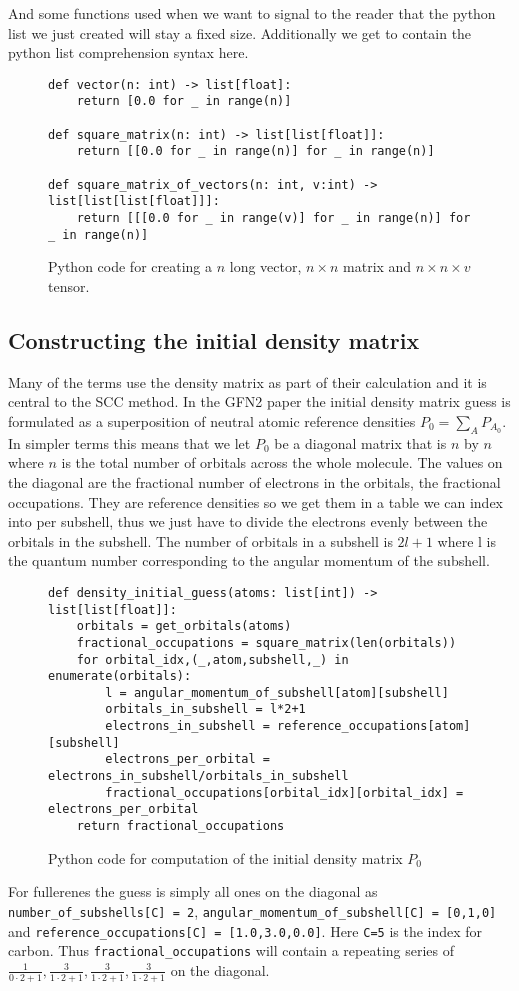 And some functions used when we want to signal to the reader that the python list we just created will stay a fixed size. Additionally we get to contain the python list comprehension syntax here. 

\begin{figure}[H]
\begin{verbatim}
def vector(n: int) -> list[float]:
    return [0.0 for _ in range(n)]

def square_matrix(n: int) -> list[list[float]]:
    return [[0.0 for _ in range(n)] for _ in range(n)]

def square_matrix_of_vectors(n: int, v:int) -> list[list[list[float]]]:
    return [[[0.0 for _ in range(v)] for _ in range(n)] for _ in range(n)]
\end{verbatim}
    \caption{Python code for creating a $n$ long vector, $n\times n$ matrix and $n\times n \times v$ tensor.}
\end{figure}
\subsection{Constructing the initial density matrix}
Many of the terms use the density matrix as part of their calculation and it is central to the SCC method. In the GFN2 paper the initial density matrix guess is formulated as a superposition of neutral atomic reference densities $P_0 = \sum_{A}P_{A_0}$. In simpler terms this means that we let $P_0$ be a diagonal matrix that is $n$ by $n$ where $n$ is the total number of orbitals across the whole molecule. The values on the diagonal are the fractional number of electrons in the orbitals, the fractional occupations. They are reference densities so we get them in a table we can index into per subshell, thus we just have to divide the electrons evenly between the orbitals in the subshell. The number of orbitals in a subshell is $2l+1$ where l is the quantum number corresponding to the angular momentum of the subshell.
\begin{figure}[H]
\begin{verbatim}
def density_initial_guess(atoms: list[int]) -> list[list[float]]:
    orbitals = get_orbitals(atoms)
    fractional_occupations = square_matrix(len(orbitals))
    for orbital_idx,(_,atom,subshell,_) in enumerate(orbitals):
        l = angular_momentum_of_subshell[atom][subshell] 
        orbitals_in_subshell = l*2+1 
        electrons_in_subshell = reference_occupations[atom][subshell]
        electrons_per_orbital = electrons_in_subshell/orbitals_in_subshell
        fractional_occupations[orbital_idx][orbital_idx] = electrons_per_orbital
    return fractional_occupations
\end{verbatim}
\caption{Python code for computation of the initial density matrix $P_0$}
    \label{lst:orbitals}
\end{figure}
For fullerenes the guess is simply all ones on the diagonal as \verb|number_of_subshells[C] = 2|, \verb|angular_momentum_of_subshell[C] = [0,1,0]| and \verb|reference_occupations[C] = [1.0,3.0,0.0]|.
Here \verb|C=5| is the index for carbon. 
Thus \verb|fractional_occupations| will contain a repeating series of $\frac{1}{0\cdot2+1},\frac{3}{1\cdot2+1},\frac{3}{1\cdot2+1},\frac{3}{1\cdot2+1}$ on the diagonal.

